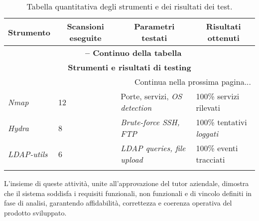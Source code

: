 \begin{center}
\begin{longtable}{|p{}|p{}|p{}|p{}|}
\hline
\multicolumn{1}{|c|}{\textbf{Strumento}} & 
\multicolumn{1}{c|}{\textbf{Scansioni eseguite}} & 
\multicolumn{1}{c|}{\textbf{Parametri testati}} & 
\multicolumn{1}{c|}{\textbf{Risultati ottenuti}} \\ 
\hline
\endfirsthead

\multicolumn{4}{c}{{\bfseries \tablename\ \thetable{} -- Continuo della tabella}}\\
\hline
\multicolumn{4}{|c|}{\textbf{Strumenti e risultati di testing}} \\ \hline
\endhead

\hline \multicolumn{4}{|r|}{{Continua nella prossima pagina...}} \\ \hline
\endfoot

\endlastfoot

\textit{Nmap} & 12 & Porte, servizi, \textit{OS detection} & 100\% servizi rilevati \\ \hline
\textit{Hydra} & 8 & \textit{Brute-force SSH, FTP} & 100\% tentativi \textit{loggati} \\ \hline
\textit{LDAP-utils} & 6 & \textit{LDAP queries, file upload} & 100\% eventi tracciati \\ \hline

\caption{Tabella quantitativa degli strumenti e dei risultati dei test.}
\label{tab:strumenti-testing}
\end{longtable}
\end{center}

L'insieme di queste attività, unite all'approvazione del tutor aziendale, dimostra che il sistema soddisfa i requisiti funzionali, non funzionali e di vincolo definiti in fase di analisi, garantendo affidabilità, correttezza e coerenza operativa del prodotto sviluppato.
